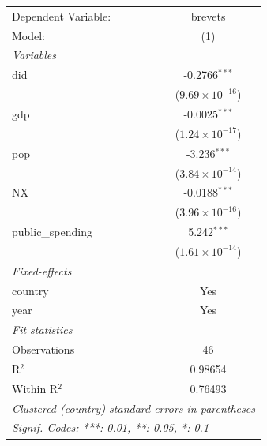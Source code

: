 \begingroup
\centering
\begin{tabular}{lc}
   \tabularnewline \midrule \midrule
   Dependent Variable: & brevets\\  
   Model:              & (1)\\  
   \midrule
   \emph{Variables}\\
   did                 & -0.2766$^{***}$\\   
                       & ($9.69\times 10^{-16}$)\\    
   gdp                 & -0.0025$^{***}$\\   
                       & ($1.24\times 10^{-17}$)\\    
   pop                 & -3.236$^{***}$\\   
                       & ($3.84\times 10^{-14}$)\\    
   NX                  & -0.0188$^{***}$\\   
                       & ($3.96\times 10^{-16}$)\\    
   public\_spending    & 5.242$^{***}$\\   
                       & ($1.61\times 10^{-14}$)\\    
   \midrule
   \emph{Fixed-effects}\\
   country             & Yes\\  
   year                & Yes\\  
   \midrule
   \emph{Fit statistics}\\
   Observations        & 46\\  
   R$^2$               & 0.98654\\  
   Within R$^2$        & 0.76493\\  
   \midrule \midrule
   \multicolumn{2}{l}{\emph{Clustered (country) standard-errors in parentheses}}\\
   \multicolumn{2}{l}{\emph{Signif. Codes: ***: 0.01, **: 0.05, *: 0.1}}\\
\end{tabular}
\par\endgroup
